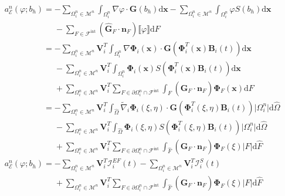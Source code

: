 \documentclass[11pt, a4paper, oneside]{report}
\begin{document}
\begin{equation}
    \begin{aligned}
        & a_\mathcal{E}^n(\varphi; b_h) = - \sum_{\Omega_i^n \in \mathcal{M}^n} \int_{\Omega_i^n} \nabla \varphi \cdot \bm{G}(b_h) \text{d}\bm{x} - \sum_{\Omega_i^n \in \mathcal{M}^n} \int_{\Omega_i^n} \varphi S(b_h) \text{d}\bm{x} \\
        & \phantom{a_\mathcal{E}^n(\varphi; b_h) = } - \sum_{F \in \mathcal{F}^\text{int}} \left( \bm{\widehat{G}}_F \cdot \bm{n}_F \right) \llbracket \varphi \rrbracket \text{d}F \\
        & \phantom{a_\mathcal{E}^n(\varphi; b_h) } = - \sum_{\Omega_i^n \in \mathcal{M}^n} \bm{V}_i^T \int_{\Omega_i^n} \nabla \bm{\Phi}_i(\bm{x}) \cdot \bm{G} \left( \bm{\Phi}_i^T(\bm{x}) \bm{B}_i(t) \right) \text{d}\bm{x} \\
        & \phantom{a_\mathcal{E}^n(\varphi; b_h) = } - \sum_{\Omega_i^n \in \mathcal{M}^n} \bm{V}_i^T \int_{\Omega_i^n} \bm{\Phi}_i(\bm{x}) S \left( \bm{\Phi}_i^T(\bm{x}) \bm{B}_i(t) \right) \text{d}\bm{x} \\
        & \phantom{a_\mathcal{E}^n(\varphi; b_h) = } + \sum_{\Omega_i^n \in \mathcal{M}^n} \bm{V}_i^T \sum_{F \in \partial \Omega_i^n \cap \mathcal{F}^\text{int}} \int_F \left( \bm{\widehat{G}}_F \cdot \bm{n}_F \right) \bm{\Phi}_F(\bm{x}) \text{d}F \\
        & \phantom{a_\mathcal{E}^n(\varphi; b_h) } = - \sum_{\Omega_i^n \in \mathcal{M}^n} \bm{V}_i^T \int_{\widehat{\Omega}} \widetilde{\nabla}_i \bm{\Phi}_i(\xi, \eta) \cdot \bm{G} \left( \bm{\Phi}_i^T(\xi, \eta) \bm{B}_i(t) \right) \lvert \Omega_i^n \rvert \text{d}\widehat{\Omega} \\
        & \phantom{a_\mathcal{E}^n(\varphi; b_h) = } - \sum_{\Omega_i^n \in \mathcal{M}^n} \bm{V}_i^T \int_{\widehat{\Omega}} \bm{\Phi}_i(\xi, \eta) S \left( \bm{\Phi}_i^T(\xi, \eta) \bm{B}_i(t) \right) \lvert \Omega_i^n \rvert \text{d}\widehat{\Omega} \\
        & \phantom{a_\mathcal{E}^n(\varphi; b_h) = } + \sum_{\Omega_i^n \in \mathcal{M}^n} \bm{V}_i^T \sum_{F \in \partial \Omega_i^n \cap \mathcal{F}^\text{int}} \int_{\widehat{F}} \left( \bm{\widehat{G}}_F \cdot \bm{n}_F \right) \bm{\Phi}_F(\xi) \lvert F \rvert \text{d}\widehat{F} \\
        & a_\mathcal{E}^n(\varphi; b_h) = - \sum_{\Omega_i^n \in \mathcal{M}^n} \bm{V}_i^T \bm{\mathcal{I}}_i^{EF}(t) - \sum_{\Omega_i^n \in \mathcal{M}^n} \bm{V}_i^T \bm{\mathcal{I}}_i^S(t) \\
        & \phantom{a_\mathcal{E}^n(\varphi; b_h) = } + \sum_{\Omega_i^n \in \mathcal{M}^n} \bm{V}_i^T \sum_{F \in \partial \Omega_i^n \cap \mathcal{F}^\text{int}} \int_{\widehat{F}} \left( \bm{\widehat{G}}_F \cdot \bm{n}_F \right) \bm{\Phi}_F(\xi) \lvert F \rvert \text{d}\widehat{F}
    \end{aligned}
\end{equation}
\end{document}
